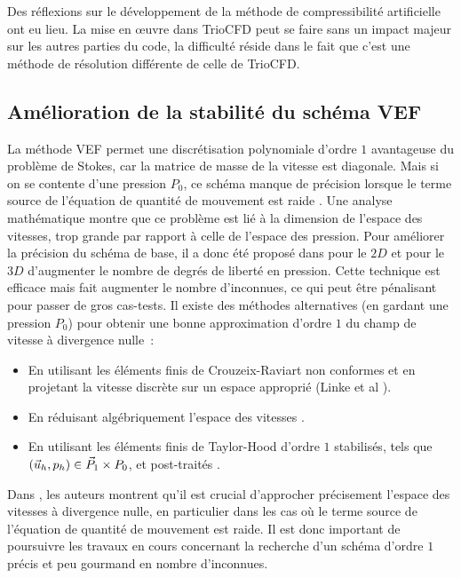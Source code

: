 \begin{rque}
 
Des r\'eflexions sur le d\'eveloppement de la m\'ethode de compressibilit\'e artificielle ont eu lieu. La mise en {\oe}uvre dans TrioCFD peut se faire sans un impact majeur sur les autres parties du code, la difficult\'e r\'eside dans le fait que c'est une m\'ethode de r\'esolution diff\'erente de celle de TrioCFD. 
\end{rque}

\subsection{Am\'elioration de la stabilit\'e du sch\'ema VEF}
\label{Progres-VEF}

La m\'ethode VEF permet une discr\'etisation polynomiale d'ordre $1$ avantageuse du probl\`eme de Stokes, car la matrice de masse de la vitesse est diagonale. Mais si on se contente d'une pression $P_0$, ce sch\'ema manque de pr\'ecision lorsque le terme  source de l'\'equation de quantit\'e de mouvement est raide \cite{Emon92}. Une analyse math\'ematique montre que ce probl\`eme est li\'e \`a la dimension de l'espace des vitesses, trop grande par rapport \`a celle de l'espace des pression. Pour am\'eliorer la pr\'ecision du sch\'ema de base, il a donc \'et\'e propos\'e dans \cite{Heib03} pour le $2D$ et \cite{Fort06} pour le $3D$ d'augmenter le nombre de degr\'es de libert\'e en pression. Cette technique est efficace mais fait augmenter le nombre d'inconnues, ce qui peut \^etre p\'enalisant pour passer de gros cas-tests. Il existe des m\'ethodes alternatives (en gardant une pression $P_0$) pour obtenir une bonne approximation d'ordre $1$ du champ de vitesse \`a divergence nulle~:
\begin{itemize}
\item En utilisant les \'el\'ements finis de Crouzeix-Raviart non conformes et en projetant la vitesse discr\`ete sur un espace appropri\'e (Linke et al \cite{Link14,JKMN17}).
\item En r\'eduisant alg\'ebriquement l'espace des vitesses \cite{Hech81}.
\item En utilisant les \'el\'ements finis de Taylor-Hood d'ordre $1$  stabilis\'es, tels que $(\velocity_h,p_h)\in\vec{P}_1\times P_0$, et post-trait\'es \cite{BaVa10,AlBN18}. 
\end{itemize}
Dans \cite{GLRW12}, les auteurs montrent qu'il est crucial d'approcher pr\'ecisement l'espace des vitesses \`a divergence nulle, en particulier dans les cas o\`u le terme  source de l'\'equation de quantit\'e de mouvement est raide. Il est donc important de poursuivre les travaux en cours concernant la recherche d'un sch\'ema d'ordre $1$ pr\'ecis et peu gourmand en nombre d'inconnues.
